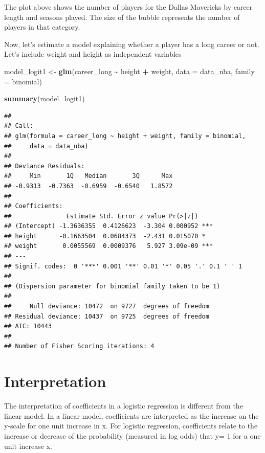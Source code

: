 \documentclass[
]{book}
\newenvironment{Shaded}{\begin{snugshade}}{\end{snugshade}}
\newcommand{\AttributeTok}[1]{\textcolor[rgb]{0.13,0.29,0.53}{#1}}
\newcommand{\FunctionTok}[1]{\textcolor[rgb]{0.13,0.29,0.53}{\textbf{#1}}}
\newcommand{\NormalTok}[1]{#1}
\newcommand{\OtherTok}[1]{\textcolor[rgb]{0.56,0.35,0.01}{#1}}
\newcommand{\SpecialCharTok}[1]{\textcolor[rgb]{0.81,0.36,0.00}{\textbf{#1}}}
\begin{document}
The plot above shows the number of players for the Dallas Mavericks by career length
and seasons played. The size of the bubble represents the number of players in that
category.

Now, let's estimate a model explaining whether a player has a long career or not.
Let's include weight and height as independent variables

\begin{Shaded}
\begin{Highlighting}[]
\NormalTok{model\_logit1 }\OtherTok{\textless{}{-}} \FunctionTok{glm}\NormalTok{(career\_long }\SpecialCharTok{\textasciitilde{}}\NormalTok{ height }\SpecialCharTok{+}\NormalTok{ weight,}
                    \AttributeTok{data =}\NormalTok{ data\_nba,}
                    \AttributeTok{family =}\NormalTok{ binomial)}

\FunctionTok{summary}\NormalTok{(model\_logit1)}
\end{Highlighting}
\end{Shaded}

\begin{verbatim}
## 
## Call:
## glm(formula = career_long ~ height + weight, family = binomial, 
##     data = data_nba)
## 
## Deviance Residuals: 
##     Min       1Q   Median       3Q      Max  
## -0.9313  -0.7363  -0.6959  -0.6540   1.8572  
## 
## Coefficients:
##               Estimate Std. Error z value Pr(>|z|)    
## (Intercept) -1.3636355  0.4126623  -3.304 0.000952 ***
## height      -0.1663504  0.0684373  -2.431 0.015070 *  
## weight       0.0055569  0.0009376   5.927 3.09e-09 ***
## ---
## Signif. codes:  0 '***' 0.001 '**' 0.01 '*' 0.05 '.' 0.1 ' ' 1
## 
## (Dispersion parameter for binomial family taken to be 1)
## 
##     Null deviance: 10472  on 9727  degrees of freedom
## Residual deviance: 10437  on 9725  degrees of freedom
## AIC: 10443
## 
## Number of Fisher Scoring iterations: 4
\end{verbatim}

\hypertarget{interpretation-2}{%
\section{Interpretation}\label{interpretation-2}}

The interpretation of coefficients in a logistic regression is different from
the linear model. In a linear model, coefficients are interpreted as the increase
on the y-scale for one unit increase in x. For logistic regression, coefficients
relate to the increase or decrease of the probability (measured in log odds) that
y= 1 for a one unit increase x.
\end{document}
